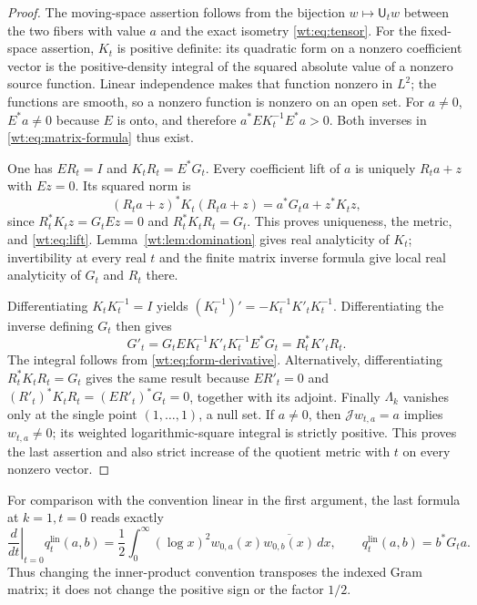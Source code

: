 \begin{proof}
The moving-space assertion follows from the bijection
$w\mapsto\mathsf U_tw$ between the two fibers with value $a$
and the exact isometry \eqref{wt:eq:tensor}.
For the fixed-space assertion, $K_t$ is positive definite:
its quadratic form on a nonzero coefficient vector is the
positive-density integral of the squared absolute value of a
nonzero source function.  Linear independence makes that function
nonzero in $L^2$; the functions are smooth, so a nonzero function
is nonzero on an open set.  For $a\ne0$, $E^*a\ne0$ because
$E$ is onto, and therefore
$a^*EK_t^{-1}E^*a>0$.  Both inverses in
\eqref{wt:eq:matrix-formula} thus exist.

One has $ER_t=I$ and $K_tR_t=E^*G_t$.  Every coefficient lift
of $a$ is uniquely $R_ta+z$ with $Ez=0$.  Its squared norm is
\[
 (R_ta+z)^*K_t(R_ta+z)=a^*G_ta+z^*K_tz,
\]
since $R_t^*K_tz=G_tEz=0$ and
$R_t^*K_tR_t=G_t$.  This proves uniqueness, the metric, and
\eqref{wt:eq:lift}.  Lemma~\ref{wt:lem:domination} gives real
analyticity of $K_t$; invertibility at every real $t$ and the
finite matrix inverse formula give local real analyticity of
$G_t$ and $R_t$ there.

Differentiating $K_tK_t^{-1}=I$ yields
$(K_t^{-1})'=-K_t^{-1}K'_tK_t^{-1}$.  Differentiating the
inverse defining $G_t$ then gives
\[
 G'_t=G_tEK_t^{-1}K'_tK_t^{-1}E^*G_t=R_t^*K'_tR_t.
\]
The integral follows from \eqref{wt:eq:form-derivative}.
Alternatively, differentiating $R_t^*K_tR_t=G_t$ gives the
same result because $ER'_t=0$ and
$(R'_t)^*K_tR_t=(ER'_t)^*G_t=0$, together with its adjoint.
Finally $\Lambda_k$ vanishes only at the single point
$(1,\ldots,1)$, a null set.  If $a\ne0$, then
$\mathcal Jw_{t,a}=a$ implies $w_{t,a}\ne0$; its weighted
logarithmic-square integral is strictly positive.  This proves
the last assertion and also strict increase of the quotient
metric with $t$ on every nonzero vector.
\end{proof}

For comparison with the convention linear in the first argument,
the last formula at $k=1,t=0$ reads exactly
\begin{equation}\label{wt:eq:linear-first}
 \left.\frac d{dt}\right|_{t=0}q_t^{\mathrm{lin}}(a,b)
 =\frac12\int_0^\infty(\log x)^2w_{0,a}(x)
                         \overline{w_{0,b}(x)}\,dx,
 \qquad q_t^{\mathrm{lin}}(a,b)=b^*G_ta.
\end{equation}
Thus changing the inner-product convention transposes the indexed
Gram matrix; it does not change the positive sign or the factor
$1/2$.

